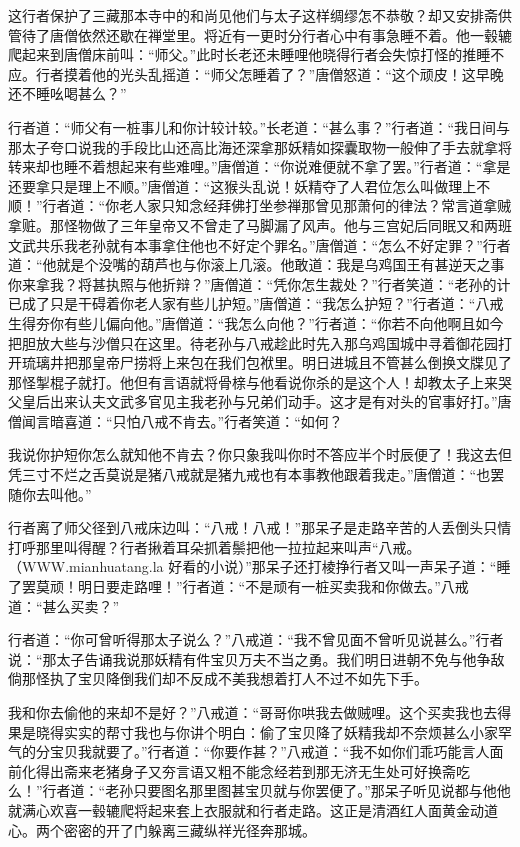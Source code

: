 \documentclass[12pt,UTF8]{ctexbook}
\begin{document}
这行者保护了三藏那本寺中的和尚见他们与太子这样绸缪怎不恭敬？却又安排斋供管待了唐僧依然还歇在禅堂里。将近有一更时分行者心中有事急睡不着。他一毂辘爬起来到唐僧床前叫：“师父。”此时长老还未睡哩他晓得行者会失惊打怪的推睡不应。行者摸着他的光头乱摇道：“师父怎睡着了？”唐僧怒道：“这个顽皮！这早晚还不睡吆喝甚么？”

行者道：“师父有一桩事儿和你计较计较。”长老道：“甚么事？”行者道：“我日间与那太子夸口说我的手段比山还高比海还深拿那妖精如探囊取物一般伸了手去就拿将转来却也睡不着想起来有些难哩。”唐僧道：“你说难便就不拿了罢。”行者道：“拿是还要拿只是理上不顺。”唐僧道：“这猴头乱说！妖精夺了人君位怎么叫做理上不顺！”行者道：“你老人家只知念经拜佛打坐参禅那曾见那萧何的律法？常言道拿贼拿赃。那怪物做了三年皇帝又不曾走了马脚漏了风声。他与三宫妃后同眠又和两班文武共乐我老孙就有本事拿住他也不好定个罪名。”唐僧道：“怎么不好定罪？”行者道：“他就是个没嘴的葫芦也与你滚上几滚。他敢道：我是乌鸡国王有甚逆天之事你来拿我？将甚执照与他折辩？”唐僧道：“凭你怎生裁处？”行者笑道：“老孙的计已成了只是干碍着你老人家有些儿护短。”唐僧道：“我怎么护短？”行者道：“八戒生得夯你有些儿偏向他。”唐僧道：“我怎么向他？”行者道：“你若不向他啊且如今把胆放大些与沙僧只在这里。待老孙与八戒趁此时先入那乌鸡国城中寻着御花园打开琉璃井把那皇帝尸捞将上来包在我们包袱里。明日进城且不管甚么倒换文牒见了那怪掣棍子就打。他但有言语就将骨榇与他看说你杀的是这个人！却教太子上来哭父皇后出来认夫文武多官见主我老孙与兄弟们动手。这才是有对头的官事好打。”唐僧闻言暗喜道：“只怕八戒不肯去。”行者笑道：“如何？

我说你护短你怎么就知他不肯去？你只象我叫你时不答应半个时辰便了！我这去但凭三寸不烂之舌莫说是猪八戒就是猪九戒也有本事教他跟着我走。”唐僧道：“也罢随你去叫他。”

行者离了师父径到八戒床边叫：“八戒！八戒！”那呆子是走路辛苦的人丢倒头只情打呼那里叫得醒？行者揪着耳朵抓着鬃把他一拉拉起来叫声“八戒。（WWW.mianhuatang.la 好看的小说）”那呆子还打棱挣行者又叫一声呆子道：“睡了罢莫顽！明日要走路哩！”行者道：“不是顽有一桩买卖我和你做去。”八戒道：“甚么买卖？”

行者道：“你可曾听得那太子说么？”八戒道：“我不曾见面不曾听见说甚么。”行者说：“那太子告诵我说那妖精有件宝贝万夫不当之勇。我们明日进朝不免与他争敌倘那怪执了宝贝降倒我们却不反成不美我想着打人不过不如先下手。

我和你去偷他的来却不是好？”八戒道：“哥哥你哄我去做贼哩。这个买卖我也去得果是晓得实实的帮寸我也与你讲个明白：偷了宝贝降了妖精我却不奈烦甚么小家罕气的分宝贝我就要了。”行者道：“你要作甚？”八戒道：“我不如你们乖巧能言人面前化得出斋来老猪身子又夯言语又粗不能念经若到那无济无生处可好换斋吃么！”行者道：“老孙只要图名那里图甚宝贝就与你罢便了。”那呆子听见说都与他他就满心欢喜一毂辘爬将起来套上衣服就和行者走路。这正是清酒红人面黄金动道心。两个密密的开了门躲离三藏纵祥光径奔那城。
\end{document}
